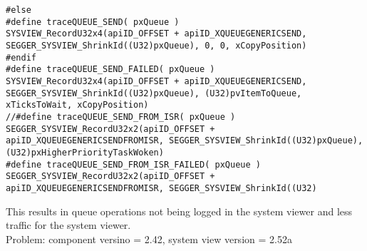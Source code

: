 \begin{lstlisting}
#else
#define traceQUEUE_SEND( pxQueue )                                    SYSVIEW_RecordU32x4(apiID_OFFSET + apiID_XQUEUEGENERICSEND, SEGGER_SYSVIEW_ShrinkId((U32)pxQueue), 0, 0, xCopyPosition)
#endif
#define traceQUEUE_SEND_FAILED( pxQueue )                             SYSVIEW_RecordU32x4(apiID_OFFSET + apiID_XQUEUEGENERICSEND, SEGGER_SYSVIEW_ShrinkId((U32)pxQueue), (U32)pvItemToQueue, xTicksToWait, xCopyPosition)
//#define traceQUEUE_SEND_FROM_ISR( pxQueue )                           SEGGER_SYSVIEW_RecordU32x2(apiID_OFFSET + apiID_XQUEUEGENERICSENDFROMISR, SEGGER_SYSVIEW_ShrinkId((U32)pxQueue), (U32)pxHigherPriorityTaskWoken)
#define traceQUEUE_SEND_FROM_ISR_FAILED( pxQueue )                    SEGGER_SYSVIEW_RecordU32x2(apiID_OFFSET + apiID_XQUEUEGENERICSENDFROMISR, SEGGER_SYSVIEW_ShrinkId((U32)
\end{lstlisting}
This results in queue operations not being logged in the system viewer and less traffic for the system viewer.\\
Problem: component versino = 2.42, system view version = 2.52a\\